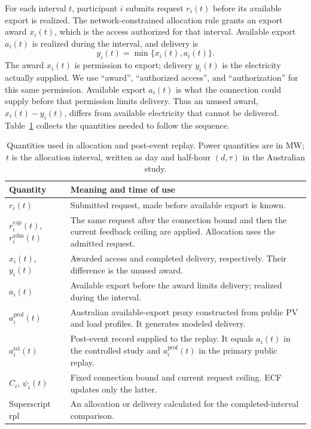 \documentclass[twoside,twocolumn,9pt]{article}
\begin{document}
For each interval $t$, participant $i$ submits request $r_i(t)$ before its available
export is realized. The network-constrained allocation rule grants an export award
$x_i(t)$, which is the access authorized for that interval. Available export
$a_i(t)$ is realized during the interval, and delivery is
\begin{equation}
y_i(t)=\min\{x_i(t),a_i(t)\}.
\label{eq:concept_delivery}
\end{equation}
The award $x_i(t)$ is permission to export; delivery $y_i(t)$ is the electricity
actually supplied. We use ``award'', ``authorized access'', and
``authorization'' for this same permission. Available export $a_i(t)$ is what
the connection could supply before that permission limits delivery. Thus an
unused award, $x_i(t)-y_i(t)$, differs from available electricity that cannot be
delivered. Table~\ref{tab:quantity_guide} collects the quantities needed to follow
the sequence.

\begin{table}[!t]
\centering
\caption{Quantities used in allocation and post-event replay. Power quantities
are in MW; $t$ is the allocation interval, written as day and half-hour
$(d,\tau)$ in the Australian study.}
\label{tab:quantity_guide}
\footnotesize
\setlength{\tabcolsep}{3pt}
\renewcommand{\arraystretch}{1.08}
\begin{tabularx}{\columnwidth}{@{}>{\raggedright\arraybackslash}p{2.25cm}X@{}}
\toprule
Quantity & Meaning and time of use \\
\midrule
$r_i(t)$ & Submitted request, made before available export is known. \\
$r_i^{\mathrm{cap}}(t)$, $r_i^{\mathrm{adm}}(t)$ & The same request after the connection bound and then the current feedback ceiling are applied. Allocation uses the admitted request. \\
$x_i(t)$, $y_i(t)$ & Awarded access and completed delivery, respectively. Their difference is the unused award. \\
$a_i(t)$ & Available export before the award limits delivery; realized during the interval. \\
$a_i^{\mathrm{prof}}(t)$ & Australian available-export proxy constructed from public PV and load profiles. It generates modeled delivery. \\
$a_i^{\mathrm{tel}}(t)$ & Post-event record supplied to the replay. It equals $a_i(t)$ in the controlled study and $a_i^{\mathrm{prof}}(t)$ in the primary public replay. \\
$C_i$, $\psi_i(t)$ & Fixed connection bound and current request ceiling. ECF updates only the latter. \\
Superscript $\mathrm{rpl}$ & An allocation or delivery calculated for the completed-interval comparison. \\
\bottomrule
\end{tabularx}
\end{table}
\end{document}
